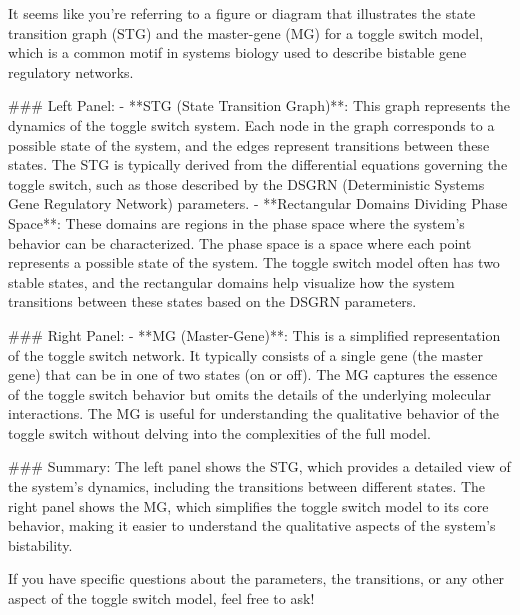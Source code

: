 It seems like you're referring to a figure or diagram that illustrates the state transition graph (STG) and the master-gene (MG) for a toggle switch model, which is a common motif in systems biology used to describe bistable gene regulatory networks.

### Left Panel:
- **STG (State Transition Graph)**: This graph represents the dynamics of the toggle switch system. Each node in the graph corresponds to a possible state of the system, and the edges represent transitions between these states. The STG is typically derived from the differential equations governing the toggle switch, such as those described by the DSGRN (Deterministic Systems Gene Regulatory Network) parameters.
- **Rectangular Domains Dividing Phase Space**: These domains are regions in the phase space where the system's behavior can be characterized. The phase space is a space where each point represents a possible state of the system. The toggle switch model often has two stable states, and the rectangular domains help visualize how the system transitions between these states based on the DSGRN parameters.

### Right Panel:
- **MG (Master-Gene)**: This is a simplified representation of the toggle switch network. It typically consists of a single gene (the master gene) that can be in one of two states (on or off). The MG captures the essence of the toggle switch behavior but omits the details of the underlying molecular interactions. The MG is useful for understanding the qualitative behavior of the toggle switch without delving into the complexities of the full model.

### Summary:
The left panel shows the STG, which provides a detailed view of the system's dynamics, including the transitions between different states. The right panel shows the MG, which simplifies the toggle switch model to its core behavior, making it easier to understand the qualitative aspects of the system's bistability.

If you have specific questions about the parameters, the transitions, or any other aspect of the toggle switch model, feel free to ask!